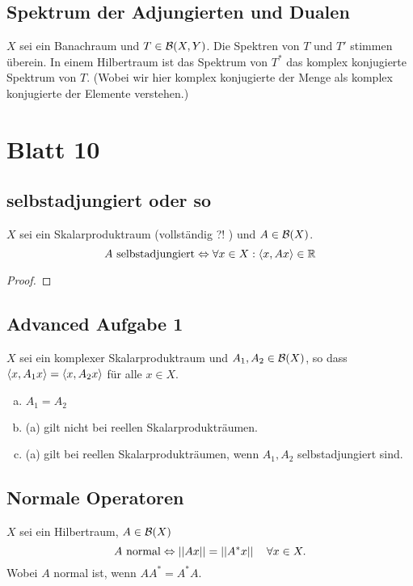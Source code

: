 \documentclass[FunkAnaSkriptSS2017.tex]{subfiles} %
\begin{document}
\subsection{ Spektrum der Adjungierten und Dualen}
	$X$ sei ein Banachraum und $T\in \mathcal{B}(X,Y)$. Die Spektren von $T$ und $T'$ stimmen überein. In einem Hilbertraum ist das Spektrum von $T^*$ das komplex konjugierte Spektrum von $T$. (Wobei wir hier komplex konjugierte der Menge als komplex konjugierte der Elemente verstehen.)
	

\newpage
\section{ Blatt 10}

\subsection{ selbstadjungiert oder so}
	$X$ sei ein Skalarproduktraum (vollständig ?! ) und $A \in \mathcal{B}(X)$. 
	$$ A \text{ selbstadjungiert} \Leftrightarrow \forall x \in X : \left \langle x,Ax \right \rangle \in \mathbb{R} $$
	\begin{proof}
	
	\end{proof}


\subsection{ Advanced Aufgabe 1}
	$X$ sei ein komplexer Skalarproduktraum und $A_1, A_2 \in \mathcal{B}(X)$, so dass $\left \langle x, A_1 x \right \rangle = \left \langle x, A_2 x \right \rangle$ für alle $x\in X$.
	\begin{enumerate}[(a)]
		\item $A_1 = A_2$
		\item (a) gilt nicht bei reellen Skalarprodukträumen.
		\item (a) gilt bei reellen Skalarprodukträumen, wenn $A_1,A_2$ selbstadjungiert sind.
	\end{enumerate}


\subsection{ Normale Operatoren}
	$X$ sei ein Hilbertraum, $A\in \mathcal{B}(X)$
	$$A \text{ normal} \Leftrightarrow \left\lvert \left\lvert  Ax  \right\rvert \right\rvert = \left\lvert \left\lvert  A^* x \right\rvert \right\rvert \quad \forall x\in X.$$
	Wobei $A$ normal ist, wenn $AA^* = A^* A$.
	
\end{document}
